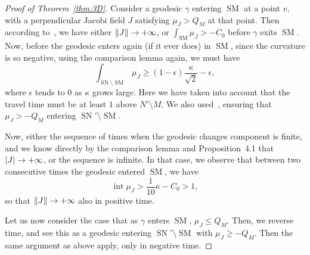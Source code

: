 \documentclass[10pt]{amsart}
\theoremstyle{definition}\newtheorem{defi}[theo]{Definition}\newtheorem{rema}[theo]{Remark}\newtheorem{exam}[theo]{Example}\newtheorem{exem}[theo]{Example}\newtheorem{nota}[theo]{Notation}
\DeclareMathOperator{\intt}{int}
\DeclareMathOperator{\SM}{SM}
\DeclareMathOperator{\SN}{SN}
\theoremstyle{plain}
\renewcommand*{\to}{\mathchoice{\longrightarrow}{\rightarrow}{\rightarrow}{\rightarrow}}
\begin{document}
\begin{proof}[Proof of Theorem~\ref{thm:3D}]
Consider a geodesic $\gamma$ entering $\SM$ at a point $v$, with a perpendicular Jacobi field $J$ satisfying $\mu_J> Q_M$ at that point. Then according to~\cite[Proposition~4.1]{Chen-Erchenko-Gogolev}, we have either $\|J\|\to+\infty$, or $\int_{\SM} \mu_J > -C_0$ before $\gamma$ exits $\SM$. Now, before the geodesic enters again (if it ever does) in $\SM$, since the curvature is so negative, using the comparison lemma again, we must have
\[
\int_{\SN\setminus \SM} \mu_J\geq (1-\epsilon) \frac{\kappa}{\sqrt{2}} - \epsilon,
\]
where $\epsilon$ tends to $0$ as $\kappa$ grows large. Here we have taken into account that the travel time must be at least $1$ above $N'\setminus M$. We also used~\cite[Proposition~4.1]{Chen-Erchenko-Gogolev}, ensuring that $\mu_J>-Q_M$ entering $\SN'\setminus \SM$.

Now, either the sequence of times when the geodesic changes component is finite, and we know directly by the comparison lemma and Proposition~4.1 that $|J|\to+\infty$, or the sequence is infinite. In that case, we observe that between two consecutive times the geodesic entered $\SM$, we have
\[
\intt \mu_J > \frac{1}{10}\kappa - C_0 > 1,
\]
so that $\|J\|\to+\infty$ also in positive time.

Let us now consider the case that as $\gamma$ enters $\SM$, $\mu_J \leq Q_M$. Then, we reverse time, and see this as a geodesic entering $\SN'\setminus \SM$ with $\mu_J \geq - Q_M$. Then the same argument as above apply, only in negative time.
\end{proof}
\end{document}
